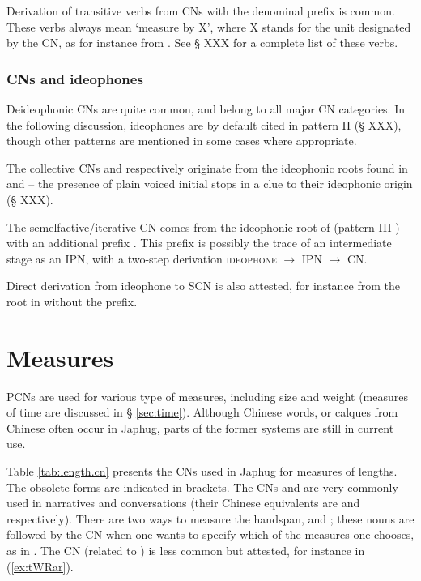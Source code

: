  
Derivation of transitive verbs from CNs with the denominal prefix  is common. These verbs always mean `measure by X', where X stands for the unit designated by the CN, as for instance  from . See § XXX for a complete list of these verbs.
 
\subsubsection{CNs and ideophones}   \label{sec:CN.ideophones}
Deideophonic CNs are quite common, and belong to all major CN categories. In the following discussion, ideophones are by default cited in pattern II (§ XXX), though other patterns are mentioned in some cases where appropriate.

The collective CNs  and  respectively originate from the ideophonic roots found in  and  -- the presence of plain voiced initial stops in a clue to their ideophonic origin (§ XXX).

The semelfactive/iterative CN  comes from the ideophonic root of  (pattern III ) with an additional prefix . This prefix is possibly the trace of an intermediate stage as an IPN, with a two-step derivation \textsc{ideophone} $\rightarrow$ IPN $\rightarrow$ CN.

Direct derivation from ideophone to SCN is also attested, for instance  from the root in  without the  prefix.

\section{Measures} \label{sec:measures}
PCNs are used for various type of measures, including size and weight (measures of time are discussed in § \ref{sec:time}). Although Chinese words, or calques from Chinese often occur in Japhug, parts of the former systems are still in current use.

Table \ref{tab:length.cn} presents the CNs used in Japhug for measures of lengths. The obsolete forms are indicated in brackets. The CNs  and  are very commonly used in narratives and conversations (their Chinese equivalents are   and    respectively). There are two ways to measure the handspan,  and ; these nouns are followed by the CN when one wants to specify which of the measures one chooses, as in . The CN  (related to ) is less common but attested, for instance in (\ref{ex:tWRar}).

